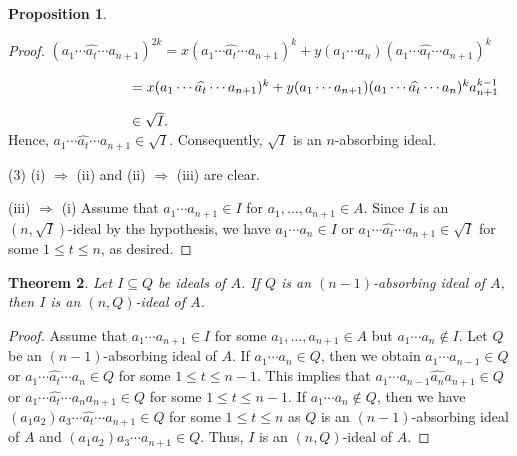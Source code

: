 \documentclass[preprint,review,10pt]{amsart}
\newtheorem{theorem}{Theorem}[section]
\theoremstyle{definition}
\newtheorem{proposition}[theorem]{Proposition}
\theoremstyle{remark}
\numberwithin{equation}{section}
\begin{document}
\begin{proposition}
\begin{proof}
$(a_1 \cdots \widehat{a_t} \cdots a_{n+1})^{2k}=x(a_1 \cdots \widehat{a_t} \cdots a_{n+1})^k+y(a_1 \cdots a_n)(a_1 \cdots \widehat{a_t} \cdots a_{n+1})^k$

$\hspace{3.1cm}=x(a_1 \cdots \widehat{a_t} \cdots a_{n+1})^k+y(a_1 \cdots a_{n+1})(a_1 \cdots \widehat{a_t} \cdots a_n)^k a_{n+1}^{k-1}$


$\hspace{3.1cm} \in \sqrt{I}.$\\
Hence, $a_1 \cdots \widehat{a_t} \cdots a_{n+1} \in\sqrt{I}$. Consequently, $\sqrt{I}$ is an $n$-absorbing  ideal.

(3) (i) $\Longrightarrow$ (ii) and (ii) $\Longrightarrow$ (iii) are clear.


(iii) $\Longrightarrow$ (i)  Assume that $a_1 \cdots a_{n+1} \in I$ for $a_1,\ldots, a_{n+1} \in A$. Since $I$ is an $(n,\sqrt{I})$-ideal by the hypothesis, we have $a_1\cdots a_n \in I$ or $a_1 \cdots \widehat{a_t} \cdots a_{n+1} \in \sqrt{I}$ for some $1 \leq t \leq n$, as desired. 
\end{proof}
\end{proposition}
\begin{theorem} \label{3}
Let $I \subseteq Q$ be ideals of $A$. If $Q$ is an $(n-1)$-absorbing ideal of $A$, then $I$ is an $(n,Q)$-ideal of $A$. 
\end{theorem}
\begin{proof}
Assume that $a_1\cdots a_{n+1} \in I$ for some $a_1,\ldots,a_{n+1} \in A$ but $a_1\cdots a_n \notin I$. Let $Q$ be  an $(n-1)$-absorbing ideal of $A$. If $a_1\cdots a_n \in Q$, then we obtain $a_1\cdots a_{n-1} \in Q$ or $a_1\cdots \widehat{a_t} \cdots a_{n} \in Q$ for some $1 \leq t \leq n-1$. This implies that $a_1\cdots a_{n-1} \widehat{a_n} a_{n+1} \in Q$ or $a_1\cdots \widehat{a_t} \cdots a_{n}a_{n+1} \in Q$ for some $1 \leq t \leq n-1$.
If $a_1\cdots a_n \notin Q$, then we have $(a_1a_2)a_3\cdots  \widehat{a_t}\cdots a_{n+1} \in Q$ for some $1 \leq t \leq n$ as $Q$ is an $(n-1)$-absorbing ideal of $A$ and $(a_1a_2)a_3\cdots   a_{n+1} \in Q$. Thus, $I$ is an $(n,Q)$-ideal of $A$. 
\end{proof}
\end{document}
